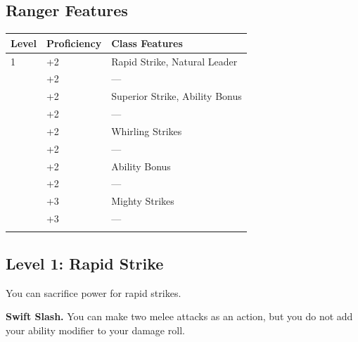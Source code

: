 \documentclass[12pt,letterpaper,twocolumn,openany,nodeprecatedcode,bg=none]{dndbook}
\let\oldsubsection\subsection
\renewcommand{\subsection}[1]{%
  \needspace{5\baselineskip}%
  \oldsubsection{#1}%
}
\begin{document}
\subsection{Ranger Features}\label{ranger-features}


{\def\LTcaptype{none} %
\begin{table}[!htbp]
\centering
\begin{tabular}{@{}
  >{\raggedright\arraybackslash}p{}
  >{\raggedright\arraybackslash}p{}
  >{\raggedright\arraybackslash}p{}@{}}
\toprule\noalign{}
\begin{minipage}[b]{\linewidth}\raggedright
Level
\end{minipage} & \begin{minipage}[b]{\linewidth}\raggedright
Proficiency
\end{minipage} & \begin{minipage}[b]{\linewidth}\raggedright
Class Features
\end{minipage} \\
\midrule\noalign{}
1 & +2 & Rapid Strike, Natural Leader \\
2 & +2 & --- \\
3 & +2 & Superior Strike, Ability Bonus \\
4 & +2 & --- \\
5 & +2 & Whirling Strikes \\
6 & +2 & --- \\
7 & +2 & Ability Bonus \\
8 & +2 & --- \\
9 & +3 & Mighty Strikes \\
10 & +3 & --- \\
\bottomrule\noalign{}
\end{tabular}
\end{table}
}

\subsection{Level 1: Rapid Strike}\label{level-1-rapid-strike}

You can sacrifice power for rapid strikes.

\textbf{Swift Slash.} You can make two melee attacks as an action, but
you do not add your ability modifier to your damage roll.
\end{document}
